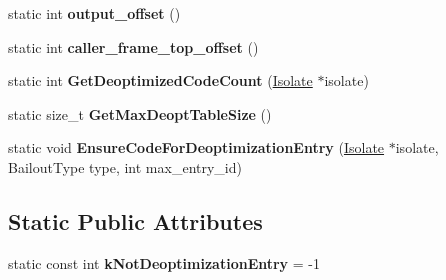 \begin{DoxyCompactItemize}
\item 
static int {\bfseries output\+\_\+offset} ()\hypertarget{classv8_1_1internal_1_1_deoptimizer_a210da11b9db7b0d1fab095ff6d9d122d}{}\label{classv8_1_1internal_1_1_deoptimizer_a210da11b9db7b0d1fab095ff6d9d122d}

\item 
static int {\bfseries caller\+\_\+frame\+\_\+top\+\_\+offset} ()\hypertarget{classv8_1_1internal_1_1_deoptimizer_a0bb7b04295b51b5a23c59e77dbc84c74}{}\label{classv8_1_1internal_1_1_deoptimizer_a0bb7b04295b51b5a23c59e77dbc84c74}

\item 
static int {\bfseries Get\+Deoptimized\+Code\+Count} (\hyperlink{classv8_1_1internal_1_1_isolate}{Isolate} $\ast$isolate)\hypertarget{classv8_1_1internal_1_1_deoptimizer_a880004c229c7157a3d87ce9ea312f889}{}\label{classv8_1_1internal_1_1_deoptimizer_a880004c229c7157a3d87ce9ea312f889}

\item 
static size\+\_\+t {\bfseries Get\+Max\+Deopt\+Table\+Size} ()\hypertarget{classv8_1_1internal_1_1_deoptimizer_aebc80140c294c7bb1a5ddb6c562148f2}{}\label{classv8_1_1internal_1_1_deoptimizer_aebc80140c294c7bb1a5ddb6c562148f2}

\item 
static void {\bfseries Ensure\+Code\+For\+Deoptimization\+Entry} (\hyperlink{classv8_1_1internal_1_1_isolate}{Isolate} $\ast$isolate, Bailout\+Type type, int max\+\_\+entry\+\_\+id)\hypertarget{classv8_1_1internal_1_1_deoptimizer_a5a550dbf313047056fc3d1bf6ebe36e9}{}\label{classv8_1_1internal_1_1_deoptimizer_a5a550dbf313047056fc3d1bf6ebe36e9}

\end{DoxyCompactItemize}
\subsection*{Static Public Attributes}
\begin{DoxyCompactItemize}
\item 
static const int {\bfseries k\+Not\+Deoptimization\+Entry} = -\/1\hypertarget{classv8_1_1internal_1_1_deoptimizer_a670edfccf46146bdfbb870239c84f0a9}{}\label{classv8_1_1internal_1_1_deoptimizer_a670edfccf46146bdfbb870239c84f0a9}

\end{DoxyCompactItemize}
